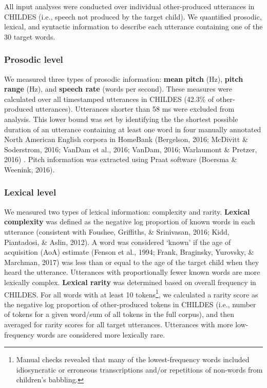 \documentclass[10pt, letterpaper]{article}
\begin{document}
All input analyses were conducted over individual other-produced
utterances in CHILDES (i.e., speech not produced by the target child).
We quantified prosodic, lexical, and syntactic information to describe
each utterance containing one of the 30 target words.

\hypertarget{prosodic-level}{%
\subsubsection{Prosodic level}\label{prosodic-level}}

We measured three types of prosodic information: \textbf{mean pitch}
(Hz), \textbf{pitch range} (Hz), and \textbf{speech rate} (words per
second). These measures were calculated over all timestamped utterances
in CHILDES (42.3\% of other-produced utterances). Utterances shorter
than 58 ms were excluded from analysis. This lower bound was set by
identifying the the shortest possible duration of an utterance
containing at least one word in four manually annotated North American
English corpora in HomeBank (Bergelson, 2016; McDivitt \& Soderstrom,
2016; VanDam et al., 2016; VanDam, 2016; Warlaumont \& Pretzer, 2016) .
Pitch information was extracted using Praat software (Boersma \&
Weenink, 2016).

\hypertarget{lexical-level}{%
\subsubsection{Lexical level}\label{lexical-level}}

We measured two types of lexical information: complexity and rarity.
\textbf{Lexical complexity} was defined as the negative log proportion
of known words in each utterance (consistent with Foushee, Griffiths, \&
Srinivasan, 2016; Kidd, Piantadosi, \& Aslin, 2012). A word was
considered `known' if the age of acquisition (AoA) estimate (Fenson et
al., 1994; Frank, Braginsky, Yurovsky, \& Marchman, 2017) was less than
or equal to the age of the target child when they heard the utterance.
Utterances with proportionally fewer known words are more lexically
complex. \textbf{Lexical rarity} was determined based on overall
frequency in CHILDES. For all words with at least 10 tokens\footnote{Manual
  checks revealed that many of the lowest-frequency words included
  idiosyncratic or erroneous transcriptions and/or repetitions of
  non-words from children's babbling.}, we calculated a rarity score as
the negative log proportion of other-produced tokens in CHILDES (i.e.,
number of tokens for a given word/sum of all tokens in the full corpus),
and then averaged for rarity scores for all target utterances.
Utterances with more low-frequency words are considered more lexically
rare.
\end{document}
